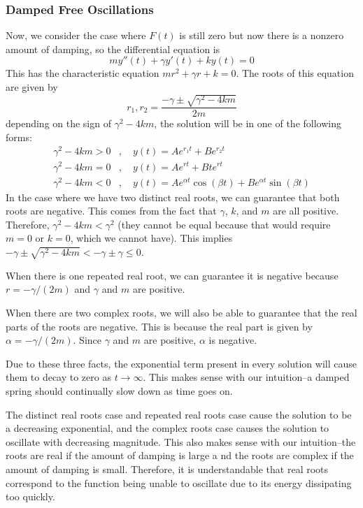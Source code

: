 \subsubsection{Damped Free Oscillations}
Now, we consider the case where $F(t)$ is still zero but now there is a nonzero amount of damping, so the differential equation is
\[ my''(t) + \gamma y'(t) + ky(t) = 0 \]
This has the characteristic equation $mr^2 + \gamma r + k = 0$. The roots of this equation are given by
\[ r_1, r_2 = \frac{-\gamma \pm \sqrt{\gamma ^2 - 4km}}{2m} \]
depending on the sign of $\gamma^2-4km$, the solution will be in one of the following forms:
\begin{align*}
    \gamma^2-4km > 0&, \quad y(t) = Ae^{r_1t} + Be^{r_2 t} \\
    \gamma^2-4km = 0&,\quad y(t) = Ae^{rt} + Bte^{rt} \\
    \gamma^2-4km < 0&,\quad y(t) = Ae^{\alpha t}\cos(\beta t) + Be^{\alpha t}\sin(\beta t)
\end{align*}
In the case where we have two distinct real roots, we can guarantee that both roots are negative. This comes from the fact that $\gamma$, $k$, and $m$ are all positive. Therefore, $\gamma^2 - 4km < \gamma^2$ (they cannot be equal because that would require $m=0$ or $k=0$, which we cannot have). This implies $-\gamma \pm \sqrt{\gamma^2 - 4km} < -\gamma \pm \gamma \leq 0$. \par
When there is one repeated real root, we can guarantee it is negative because $r = -\gamma/(2m)$ and $\gamma$ and $m$ are positive. \par
When there are two complex roots, we will also be able to guarantee that the real parts of the roots are negative. This is because the real part is given by $\alpha = -\gamma/(2m)$. Since $\gamma$ and $m$ are positive, $\alpha$ is negative. \par
Due to these three facts, the exponential term present in every solution will cause them to decay to zero as $t\to\infty$. This makes sense with our intuition--a damped spring should continually slow down as time goes on. \par
The distinct real roots case and repeated real roots case cause the solution to be a decreasing exponential, and the complex roots case causes the solution to oscillate with decreasing magnitude. This also makes sense with our intuition--the roots are real if the amount of damping is large a nd the roots are complex if the amount of damping is small. Therefore, it is understandable that real roots correspond to the function being unable to oscillate due to its energy dissipating too quickly. \par
